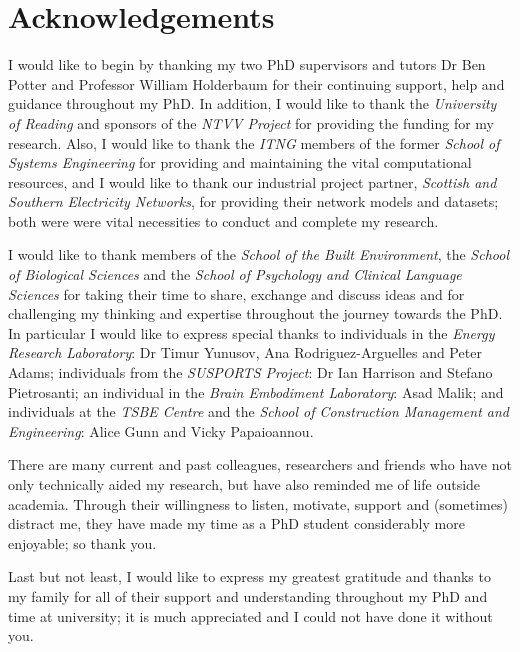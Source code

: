 \chapter*{Acknowledgements}

I would like to begin by thanking my two PhD supervisors and tutors Dr Ben Potter and Professor William Holderbaum for their continuing support, help and guidance throughout my PhD.
In addition, I would like to thank the \textit{University of Reading} and sponsors of the \textit{NTVV Project} for providing the funding for my research.
Also, I would like to thank the \textit{ITNG} members of the former \textit{School of Systems Engineering} for providing and maintaining the vital computational resources, and I would like to thank our industrial project partner, \textit{Scottish and Southern Electricity Networks}, for providing their network models and datasets; both were were vital necessities to conduct and complete my research.

I would like to thank members of the \textit{School of the Built Environment}, the \textit{School of Biological Sciences} and the \textit{School of Psychology and Clinical Language Sciences} for taking their time to share, exchange and discuss ideas and for challenging my thinking and expertise throughout the journey towards the PhD.
In particular I would like to express special thanks to individuals in the \textit{Energy Research Laboratory}: Dr Timur Yunusov, Ana Rodriguez-Arguelles and Peter Adams; individuals from the \textit{SUSPORTS Project}: Dr Ian Harrison and Stefano Pietrosanti; an individual in the \textit{Brain Embodiment Laboratory}: Asad Malik; and individuals at the \textit{TSBE Centre} and the \textit{School of Construction Management and Engineering}: Alice Gunn and Vicky Papaioannou.

There are many current and past colleagues, researchers and friends who have not only technically aided my research, but have also reminded me of life outside academia.
Through their willingness to listen, motivate, support and (sometimes) distract me, they have made my time as a PhD student considerably more enjoyable; so thank you.


Last but not least, I would like to express my greatest gratitude and thanks to my family for all of their support and understanding throughout my PhD and time at university; it is much appreciated and I could not have done it without you.